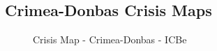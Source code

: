 \documentclass{article}
\begin{document}
\hypertarget{crimea-donbas-crisis-maps}{%
\subsection{Crimea-Donbas Crisis Maps}\label{crimea-donbas-crisis-maps}}

\begin{figure}[H]
\caption{Crisis Map - Crimea-Donbas - ICBe \label{fig:p_471_icbe}}
\end{figure}

\hphantom{em}
\begin{figure}[H]
\end{figure}
\end{document}
